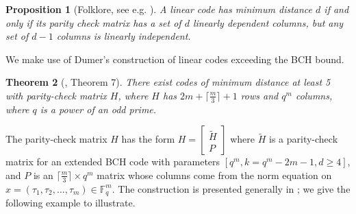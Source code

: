 \documentclass[12pt]{article}%
\newtheorem{theorem}{Theorem}[section]
\newtheorem{proposition}[theorem]{Proposition}
\begin{document}
\begin{proposition}[Folklore, see e.g. \cite{huffman2010fundamentals}]\label{prop: folklore}
   A linear code has minimum distance $d$ if and only if its parity check matrix has a set of $d$ linearly dependent columns, but any set of $d-1$ columns is linearly independent. %
\end{proposition}
   
We make use of Dumer's construction \cite{dumerdouble} of linear codes exceeding the BCH bound. 

\begin{theorem}[\cite{dumerdouble}, Theorem 7]\label{parity check dimensions}
  There exist codes of minimum distance at least 5 with parity-check matrix $H$, where $H$ has  %
  $2m+\lceil \frac{m}{3}\rceil+1$ rows and $q^m$ columns, where $q$ is a power of an odd prime.
\end{theorem}

The parity-check matrix $H$ has the form $\displaystyle H= \begin{bmatrix} \tilde{H} \\\hline P \end{bmatrix}$
where $\tilde{H}$ is a parity-check matrix for an extended BCH code with parameters $[q^m, k= q^m-2m-1, d\geq 4]$, and $P$ is an $\lceil \frac{m}{3} \rceil \times q^m$ matrix whose columns come from the norm equation on $x=(\tau_1, \tau_2, \ldots, \tau_m)\in \mathbb{F}_q^m$. The construction is presented generally in \cite{dumerdouble};  we give the following example to illustrate. 
\end{document}
